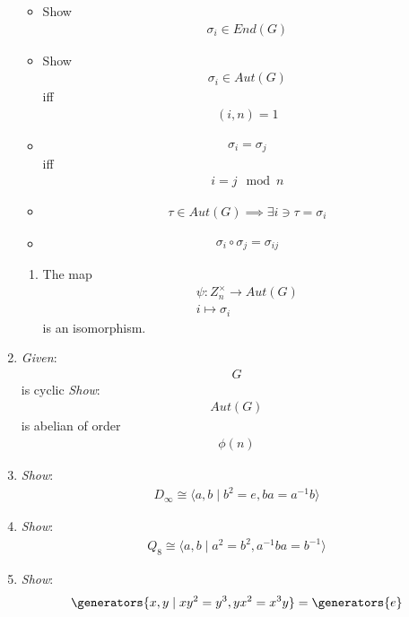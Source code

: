 \begin{enumerate}
  \begin{itemize}
  \tightlist
  \item
    Show \begin{align*}\sigma_i \in End(G)\end{align*}
  \item
    Show \begin{align*}\sigma_i \in Aut(G)\end{align*} iff
    \begin{align*}(i, n) = 1\end{align*}
  \item
    \begin{align*}\sigma_i = \sigma_j\end{align*} iff
    \begin{align*}i=j\mod n\end{align*}
  \item
    \begin{align*}\tau \in Aut(G) \implies \exists i \ni \tau = \sigma_i\end{align*}
  \item
    \begin{align*}\sigma_i \circ \sigma_j = \sigma_{ij}\end{align*}
  \end{itemize}

  \begin{enumerate}
  \def\labelenumii{\arabic{enumii}.}
  \setcounter{enumii}{5}
  \tightlist
  \item
    The map
    \begin{align*}\psi: Z_n^\times \rightarrow Aut(G)\\ i \mapsto \sigma_i\end{align*}
    is an isomorphism.
  \end{enumerate}
\item
  \emph{Given}: \begin{align*}G\end{align*} is cyclic \emph{Show}:
  \begin{align*}Aut(G)\end{align*} is abelian of order
  \begin{align*}\phi(n)\end{align*}
\item
  \emph{Show}:
  \begin{align*}D_\infty \cong \langle a,b \mid b^2 = e, ba = a^{-1} b \rangle\end{align*}
\item
  \emph{Show}:
  \begin{align*}Q_8 \cong \langle a,b \mid a^2 = b^2, a^{-1}ba = b^{-1}\rangle\end{align*}
\item
  \emph{Show}:
  \begin{align*}\generators{x,y \mid xy^2 = y^3, yx^2 = x^3y} = \generators{e}\end{align*}
\end{enumerate}

